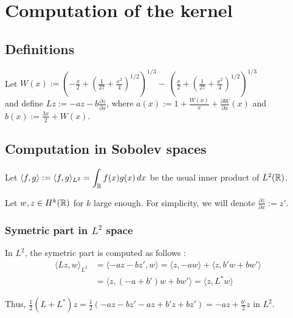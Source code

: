 \documentclass[11pt,a4paper]{article}
\begin{document}
\section{Computation of the kernel}

\subsection{Definitions}

Let $W(x) := \left( -\frac{x}{2} + \left( \frac{1}{27} + \frac{x^2}{4} \right)^{1/2} \right)^{1/3} -\  \left( \frac{x}{2} + \left( \frac{1}{27} + \frac{x^2}{4} \right)^{1/2} \right)^{1/3}$ \\


and define $Lz := -az - b\frac{\partial z}{\partial x} $, where $a(x):= 1+\frac{W(x)}{x}+\frac{\partial W}{\partial x} (x)$ and $b(x):= \frac{3x}{2} + W(x)$.

\subsection{Computation in Sobolev spaces}

Let $\langle f, g \rangle := \langle f, g \rangle_{L^2} = \displaystyle \int_\mathbb R  f(x)g(x)\,dx$ be the usual inner product of $L^2(\mathbb R)$.

Let $w,z \in H^k(\mathbb R)$ for $k$ large enough. For simplicity, we will denote $\frac{\partial z}{\partial x} := z'$.

\subsubsection{Symetric part in $L^2$ space}
In $L^2$, the symetric part is computed as follows :
\begin{align*}
  \langle Lz, w \rangle_{L^2}  &=   \langle -az - bz', w \rangle =  \langle z, -aw \rangle  +   \langle z, b'w+bw' \rangle    \\
                  &= \langle z, (-a+b')w + bw' \rangle = \langle z, L^*w \rangle
\end{align*}

Thus, $\frac{1}{2}(L+L^*)z = \frac{1}{2}(-az-bz' -az +b'z+bz') \displaystyle =-az+\frac{b'}{2}z$ in $L^2$.
\end{document}
